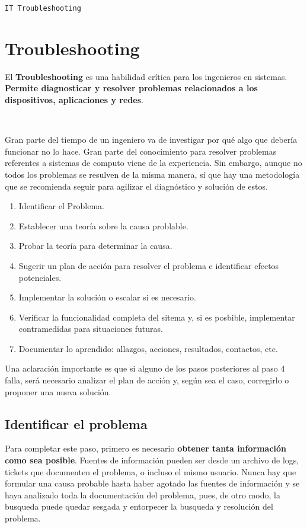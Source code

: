 \documentclass[a4paper,10pt]{article}
\begin{document}
\begin{center}
    {\Large \texttt{IT Troubleshooting}}\\
\end{center}

\tableofcontents
\newpage



\section{Troubleshooting}

El \textbf{Troubleshooting} es una habilidad crítica para los ingenieros en sistemas. \textbf{Permite diagnosticar y resolver problemas relacionados a los
dispositivos, aplicaciones y redes}. 

\

Gran parte del tiempo de un ingeniero va de investigar por qué algo que debería funcionar no lo hace. Gran parte del conocimiento para resolver problemas referentes a sistemas de computo viene
de la experiencia. Sin embargo, aunque no todos los problemas se resulven de la misma manera, sí que hay una metodología que se recomienda seguir para agilizar el diagnóstico y solución de estos.

\begin{enumerate}
    \item Identificar el Problema.
    \item Establecer una teoría sobre la causa problable.
    \item Probar la teoría para determinar la causa.
    \item Sugerir un plan de acción para resolver el problema e identificar efectos potenciales.
    \item Implementar la solución o escalar si es necesario.
    \item Verificar la funcionalidad completa del sitema y, si es posbible, implementar contramedidas para situaciones futuras.
    \item Documentar lo aprendido: allazgos, acciones, resultados, contactos, etc.
\end{enumerate}

Una aclaración importante es que si alguno de los pasos posteriores al paso 4 falla, será necesario analizar el plan de acción y, según sea el caso, corregirlo o proponer una nueva solución.

\subsection{Identificar el problema}
Para completar este paso, primero es necesario \textbf{obtener tanta información como sea posible}. Fuentes de información pueden ser desde un archivo de logs, tickets que documenten el problema,
o incluso el mismo usuario. Nunca hay que formular una causa probable hasta haber agotado las fuentes de información y se haya analizado toda la documentación del problema, pues, de otro modo, la busqueda 
puede quedar sesgada y entorpecer la busqueda y resolución del problema. 
\end{document}
